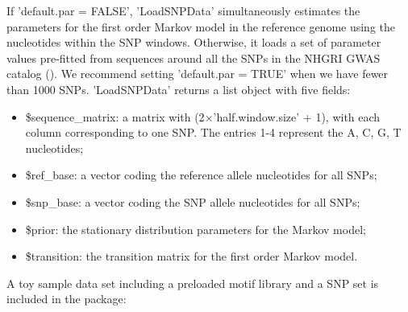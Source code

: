 \documentclass[a4paper,10pt]{article}
\begin{document}
If 'default.par = FALSE', 'LoadSNPData' simultaneously estimates the parameters for the first order Markov model in the reference genome using the nucleotides within the SNP windows. Otherwise, it loads a set of parameter values pre-fitted from sequences around all the SNPs in the NHGRI GWAS catalog (\cite{nhgri-gwas}). We recommend setting 'default.par = TRUE' when we have fewer than 1000 SNPs. 'LoadSNPData' returns a list object with five fields:

\begin{itemize}
\item \$sequence\_matrix: a matrix with (2$\times$'half.window.size' + 1), with each column corresponding to one SNP. The entries 1-4 represent the A, C, G, T nucleotides;
\item \$ref\_base: a vector coding the reference allele nucleotides for all SNPs;
\item \$snp\_base: a vector coding the SNP allele nucleotides for all SNPs;
\item \$prior: the stationary distribution parameters for the Markov model;
\item \$transition: the transition matrix for the first order Markov model.
\end{itemize}

A toy sample data set including a preloaded motif library and a SNP set is included in the package:
\end{document}
